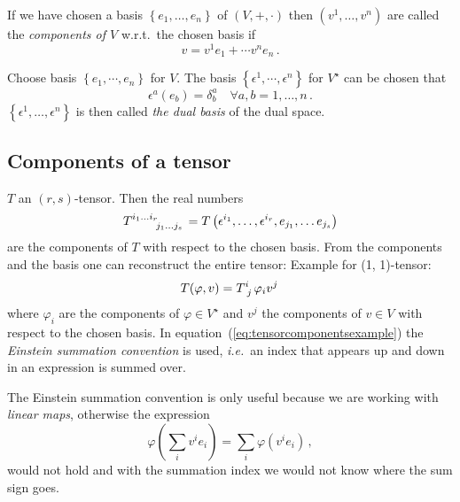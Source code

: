 \documentclass[11pt, a4paper, twocolumn]{article} %
\begin{document}
If we have chosen a basis $\left\{ e_1, \ldots, e_n \right\}$ of $(V, +, \cdot)$ then
$(v^1, \ldots, v^n)$ are called the \textit{components of $V$} w.r.t.\ the chosen basis
if
\begin{equation}
    v = v^1 e_1 + \cdots v^n e_n\,.
\end{equation}

\begin{defn}
    Choose basis $\left\{ e_1, \cdots, e_n \right\}$ for $V$. 
    The basis $\left\{ \epsilon^1, \cdots, \epsilon^n \right\}$
    for $V^\star$ can be chosen that
    \begin{equation}
        \epsilon^a(e_b) = \delta^a_b\quad \forall a,b = 1,\ldots, n\,.
    \end{equation}
    $\left\{ \epsilon^1,\dots,\epsilon^n \right\}$ is then called \textit{the dual basis} of the dual
    space.
\end{defn}

\subsection{Components of a tensor}
$T$ an $(r,s)$-tensor. Then the real numbers
\begin{equation}
    T\indices{^{i_1\ldots i_r} _{j_1\ldots j_s}} = T\left( \epsilon^{i_1},\ldots, \epsilon^{i_r}, e_{j_1}, \ldots e_{j_s}\right)
\end{equation}
are the components of $T$ with respect to the chosen basis.
From the components and the basis one can reconstruct the entire tensor:
Example for (1, 1)-tensor:
\begin{equation}
    T(\varphi, v) = T\indices{^i _j} \varphi_i v^j\, \label{eq:tensorcomponentsexample}
\end{equation}
where $\varphi_i$ are the components of $\varphi\in V^\star$ and $v^j$ the components of $v\in V$ with respect to
the chosen basis. In equation~(\ref{eq:tensorcomponentsexample}) the \textit{Einstein summation convention} is used, \textit{i.e.}\ an index that appears up and down in an expression is summed over.

\begin{note}
    The Einstein summation convention is only useful because we are working with \textit{linear maps},
    otherwise the expression
    \begin{equation}
        \varphi\left(\sum_i v^i e_i\right) = \sum_i \varphi(v^i e_i)\,, 
    \end{equation}
    would not hold and with the summation index we would not know where the sum sign goes.
\end{note}
\end{document}
